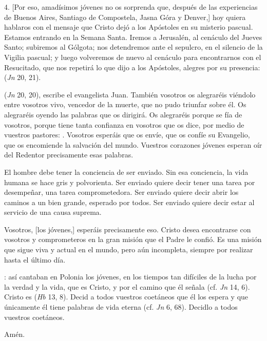 \begin{body}
4. {[Por eso, amadísimos jóvenes no os sorprenda que, después de las experiencias de Buenos Aires, Santiago de Compostela, Jasna Góra y Denver,]} hoy quiera hablaros con el mensaje que Cristo dejó a los Apóstoles en su misterio pascual. Estamos entrando en la Semana Santa. Iremos a Jerusalén, al cenáculo del Jueves Santo; subiremos al Gólgota; nos detendremos ante el sepulcro, en el silencio de la Vigilia pascual; y luego volveremos de nuevo al cenáculo para encontrarnos con el Resucitado, que nos repetirá lo que dijo a los Apóstoles, alegres por su presencia:  (\textit{Jn} 20, 21).

 (\textit{Jn} 20, 20), escribe el evangelista Juan. También vosotros os alegraréis viéndolo entre vosotros vivo, vencedor de la muerte, que no pudo triunfar sobre él. Os alegraréis oyendo las palabras que os dirigirá. Os alegraréis porque se fía de vosotros, porque tiene tanta confianza en vosotros que os dice, por medio de vuestros pastores: . Vosotros esperáis que os envíe, que os confíe su Evangelio, que os encomiende la salvación del mundo. Vuestros corazones jóvenes esperan oír del Redentor precisamente esas palabras.

El hombre debe tener la conciencia de ser enviado.  Sin esa conciencia, la vida humana se hace gris y polvorienta. Ser enviado quiere decir tener una tarea por desempeñar, una tarea comprometedora. Ser enviado quiere decir abrir los caminos a un bien grande, esperado por todos. Ser enviado quiere decir estar al servicio de una causa suprema.

Vosotros, [los jóvenes,] esperáis precisamente eso. Cristo desea encontrarse con vosotros y comprometeros en la gran misión que el Padre le confió. Es una misión que sigue viva y actual en el mundo, pero aún incompleta, siempre por realizar hasta el último día.

: así cantaban en Polonia los jóvenes, en los tiempos tan difíciles de la lucha por la verdad y la vida, que es Cristo, y por el camino que él señala (cf. \textit{Jn} 14, 6).  Cristo es  (\textit{Hb} 13, 8). Decid a todos vuestros coetáneos que él los espera y que únicamente él tiene palabras de vida eterna (cf. \textit{Jn} 6, 68). Decidlo a todos vuestros coetáneos.

Amén.
\end{body}


